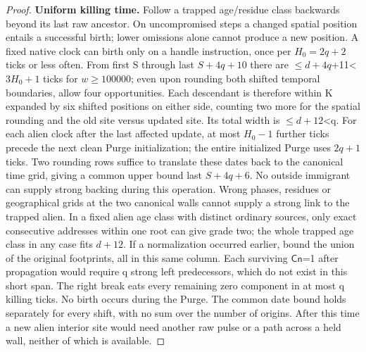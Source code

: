 \begin{proof}
\textbf{Uniform killing time.} Follow a trapped age/residue class backwards beyond its last raw ancestor. On uncompromised steps a changed spatial position entails a successful birth; lower omissions alone cannot produce a new position. A fixed native clock can birth only on a handle instruction, once per \(H_0=2q+2\) ticks or less often. From first S through last \(S+4q+10\) there are \(\le\)\(d+4q\)+11\textless{}\(3H_0+1\) ticks for \(w\ge 100000\); even upon rounding both shifted temporal boundaries, allow four opportunities. Each descendant is therefore within K expanded by six shifted positions on either side, counting two more for the spatial rounding and the old site versus updated site. Its total width is \(\le\)\(d+12\)\textless{}q. For each alien clock after the last affected update, at most \(H_0- 1\) further ticks precede the next clean Purge initialization; the entire initialized Purge uses \(2q+1\) ticks. Two rounding rows suffice to translate these dates back to the canonical time grid, giving a common upper bound last \(S+4q+6\). No outside immigrant can supply strong backing during this operation. Wrong phases, residues or geographical grids at the two canonical walls cannot supply a strong link to the trapped alien. In a fixed alien age class with distinct ordinary sources, only exact consecutive addresses within one root can give grade two; the whole trapped age class in any case fits \(d+12\). If a normalization occurred earlier, bound the union of the original footprints, all in this same column. Each surviving \(\mathsf{Cn}\)=1 after propagation would require q strong left predecessors, which do not exist in this short span. The right break eats every remaining zero component in at most q killing ticks. No birth occurs during the Purge. The common date bound holds separately for every shift, with no sum over the number of origins. After this time a new alien interior site would need another raw pulse or a path across a held wall, neither of which is available.


\end{proof}
